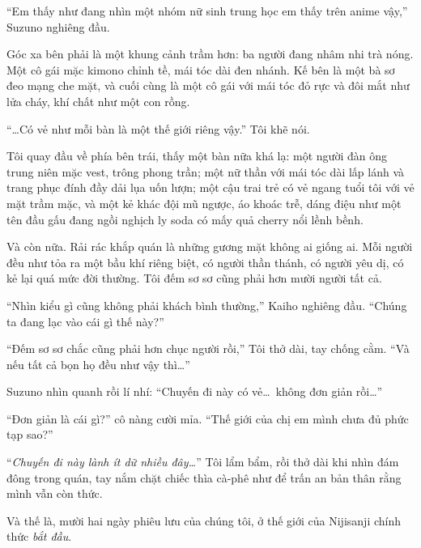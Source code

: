 \documentclass[../main.tex]{subfiles}
\begin{document}
``Em thấy như đang nhìn một nhóm nữ sinh trung học em thấy trên anime vậy,'' Suzuno nghiêng đầu.

Góc xa bên phải là một khung cảnh trầm hơn: ba người đang nhâm nhi trà nóng. Một cô gái mặc kimono chỉnh tề, mái tóc dài đen nhánh. Kế bên là một bà sơ đeo mạng che mặt, và cuối cùng là một cô gái với mái tóc đỏ rực và đôi mắt như lửa cháy, khí chất như một con rồng.

``\dots Có vẻ như mỗi bàn là một thế giới riêng vậy.'' Tôi khẽ nói.

Tôi quay đầu về phía bên trái, thấy một bàn nữa khá lạ: một người đàn ông trung niên mặc vest, trông phong trần; một nữ thần với mái tóc dài lấp lánh và trang phục đính đầy dải lụa uốn lượn; một cậu trai trẻ có vẻ ngang tuổi tôi với vẻ mặt trầm mặc, và một kẻ khác đội mũ ngược, áo khoác trễ, dáng điệu như một tên đầu gấu đang ngồi nghịch ly soda có mấy quả cherry nổi lềnh bềnh.

Và còn nữa. Rải rác khắp quán là những gương mặt không ai giống ai. Mỗi người đều như tỏa ra một bầu khí riêng biệt, có người thần thánh, có người yêu dị, có kẻ lại quá mức đời thường. Tôi đếm sơ sơ cũng phải hơn mười người tất cả.

``Nhìn kiểu gì cũng không phải khách bình thường,'' Kaiho nghiêng đầu. ``Chúng ta đang lạc vào cái gì thế này?''

``Đếm sơ sơ chắc cũng phải hơn chục người rồi,'' Tôi thở dài, tay chống cằm. ``Và nếu tất cả bọn họ đều như vậy thì\dots''

Suzuno nhìn quanh rồi lí nhí: ``Chuyến đi này có vẻ\dots\ không đơn giản rồi\dots''

``Đơn giản là cái gì?'' cô nàng cười mỉa. ``Thế giới của chị em mình chưa đủ phức tạp sao?''

``\textit{Chuyến đi này lành ít dữ nhiều đây\dots}'' Tôi lẩm bẩm, rồi thở dài khi nhìn đám đông trong quán, tay nắm chặt chiếc thìa cà-phê như để trấn an bản thân rằng mình vẫn còn thức.

Và thế là, mười hai ngày phiêu lưu của chúng tôi, ở thế giới của Nijisanji chính thức \emph{bắt đầu}.
\end{document}
